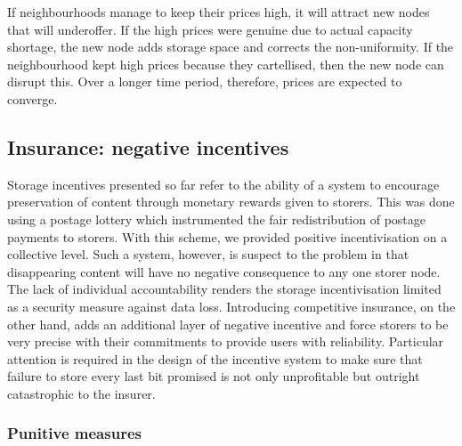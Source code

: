 If neighbourhoods manage to keep their prices high, it will attract new nodes that will underoffer. If the high prices were genuine due to actual capacity shortage, the new node adds storage space and corrects the non-uniformity. If the neighbourhood kept high prices because they cartellised, then the new node can disrupt this. Over a longer time period, therefore, prices are expected to converge.








\subsection{Insurance: negative incentives}\label{sec:chunk-insurance}


Storage incentives presented so far refer to the ability of a system to encourage preservation of content through monetary rewards given to storers. This was done using a postage lottery which instrumented the fair redistribution of postage payments to storers. With this scheme, we provided positive incentivisation on a collective level. Such a system,  however, is suspect to the  problem in that disappearing content will have no negative consequence to any one storer node. The lack of individual accountability renders the storage incentivisation limited as a security measure against data loss. Introducing competitive insurance, on the other hand, adds an additional layer of negative incentive and force storers to be very precise with their commitments to provide users with reliability. Particular attention is required in the design of the incentive system to make sure that failure to store every last bit promised is not only unprofitable but outright catastrophic to the insurer. 

\subsubsection{Punitive measures}

